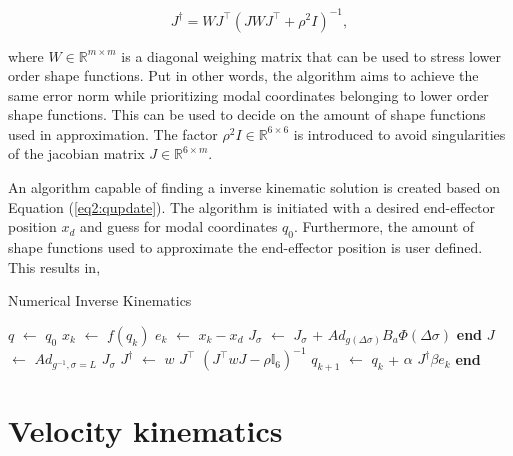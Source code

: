 \begin{equation}
    J^\dagger = WJ^\top(JWJ^\top + \rho^2 I)^{-1}
    \label{eq2:pseudoinverse},
\end{equation}

where $W \in \mathbb{R}^{m\times m}$ is a diagonal weighing matrix that can be used to stress lower order shape functions. Put in other words, the algorithm aims to achieve the same error norm while prioritizing modal coordinates belonging to lower order shape functions. This can be used to decide on the amount of shape functions used in approximation. The factor $\rho^2 I \in \mathbb{R}^{6 \times 6}$ is introduced to avoid singularities of the jacobian matrix $J \in \mathbb{R}^{6 \times m}$. 

An algorithm capable of finding a inverse kinematic solution is created based on Equation (\ref{eq2:qupdate}). The algorithm is initiated with a desired end-effector position $x_d$ and guess for modal coordinates $q_0$. Furthermore, the amount of shape functions used to approximate the end-effector position is user defined. This results in,


\begin{algorithm}[H]
\caption{Numerical Inverse Kinematics}
\begin{algorithmic}[1]
\State $q$ $\leftarrow$ $q_0$ 
      
    \State $x_k$ $\leftarrow$ $f(q_k)$  
     \State $e_k$ $\leftarrow$ $x_k - x_d$ 
            \State $J_{\sigma}$ $\leftarrow$  $J_{\sigma}$ + $Ad_{g(\Delta \sigma)} B_a \Phi(\Delta \sigma)$ 
        \EndFor
    \State \textbf{end}
    \State $J$ $\leftarrow$ $Ad_{g^{-1},\sigma=L}$ $J_{\sigma}$ 
    \State $J^{\dagger}$ $\leftarrow$  $w$ $J^{\top}$ $(J^\top w J - \rho \mathbb{I}_6)^{-1}$ 
    \State $q_{k+1}$  $\leftarrow$ $q_{k}$ + $\alpha$ $J^{\dagger} \beta e_k$ 
\EndWhile 
\State \textbf{end}
    \label{alg2:numericalinverse}
\end{algorithmic}
\end{algorithm}


\section{Velocity kinematics}


